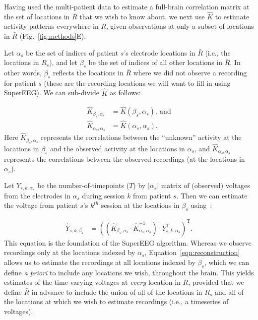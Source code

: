 \message{ !name(main.tex)}\documentclass[11pt]{article}
\begin{document}
Having used the multi-patient data to estimate a full-brain
correlation matrix at the set of locations in $\bar{R}$ that we wish
to know about, we next use $\hat{K}$ to estimate activity patterns
everywhere in $\bar{R}$, given observations at only a subset of
locations in $\bar{R}$ (Fig.~\ref{fig:methods}E).

Let $\alpha_s$ be the set of indices of patient $s$'s electrode locations in
$\bar{R}$ (i.e., the locations in $R_s$), and let $\beta_s$ be the set of indices of all other
locations in $\bar{R}$. In other words, $\beta_s$ reflects the locations
in $\bar{R}$ where we did not observe a recording for patient $s$
(these are the recording locations we will want to fill in using SuperEEG).
We can sub-divide $\hat{K}$ as follows:

\begin{align}
\hat{K}_{\beta_s,\alpha_s} &= \hat{K}(\beta_s,\alpha_s),~\mathrm{and}\label{eqn:Kba}\\
\hat{K}_{\alpha_s,\alpha_s} &= \hat{K}(\alpha_s,\alpha_s)\label{eqn:Kaa}.
\end{align}
Here $\hat{K}_{\beta_s, \alpha_s}$ represents the correlations between
the ``unknown'' activity at the locations in $\beta_s$ and the
observed activity at the locations in $\alpha_s$, and
$\hat{K}_{\alpha_s, \alpha_s}$ represents the correlations between the
observed recordings (at the locations in $\alpha_s$).

Let $Y_{s,k,\alpha_s}$ be the number-of-timepoints ($T$) by
$\left|\alpha_s\right|$ matrix of (observed) voltages from the electrodes in
$\alpha_s$ during session $k$ from patient $s$. Then we can estimate the
voltage from patient $s$'s $k^{th}$ session at the locations in
$\beta_s$ using~\cite{Rasm06}:

\begin{align}
\hat{Y}_{s,k,\beta_s} &= ((\hat{K}_{\beta_s,\alpha_s}\cdot\hat{K}_{\alpha_s,\alpha_s}^{-1})\cdot Y_{s,k,\alpha_s}^\mathrm{T})^\mathrm{T}.\label{eqn:reconstruction}
\end{align}
This equation is the foundation of the SuperEEG algorithm.  Whereas we
observe recordings only at the locations indexed by $\alpha_s$,
Equation~\ref{eqn:reconstruction} allows us to estimate the recordings
at all locations indexed by $\beta_s$, which we can define \textit{a priori}
to include any locations we wish, throughout the brain.  This yields
estimates of the time-varying voltages at \textit{every} location in
$\bar{R}$, provided that we define $\bar{R}$ in advance to include the
union of all of the locations in $R_s$ and all of the locations
at which we wish to estimate recordings (i.e., a timeseries of
voltages).
\end{document}
